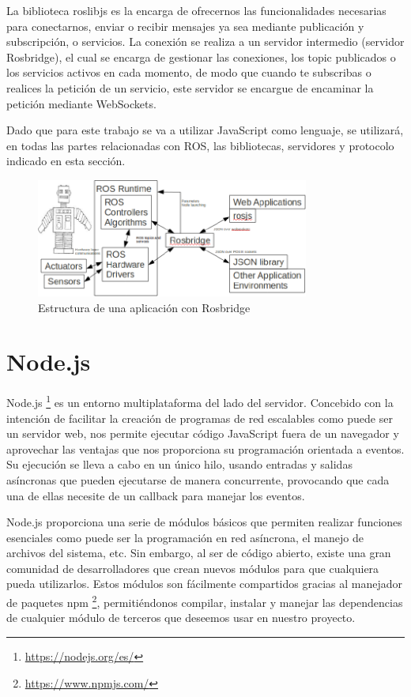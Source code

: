 La biblioteca roslibjs es la encarga de ofrecernos las funcionalidades necesarias para conectarnos, enviar o recibir mensajes ya sea mediante publicación y subscripción, o servicios. La conexión se realiza a un servidor intermedio (servidor Rosbridge), el cual se encarga de gestionar las conexiones, los topic publicados o los servicios activos en cada momento, de modo que cuando te subscribas o realices la petición de un servicio, este servidor se encargue de encaminar la petición mediante WebSockets.

Dado que para este trabajo se va a utilizar JavaScript como lenguaje, se utilizará, en todas las partes relacionadas con ROS, las bibliotecas, servidores y protocolo indicado en esta sección.

\begin{figure}[H]
  \begin{center}
    \includegraphics[width=0.8\textwidth]{figures/estructurarosbridge.png}
		\caption{Estructura de una aplicación con Rosbridge}
		\label{fig.estructurarosbridge}
		\end{center}
\end{figure}

\section{Node.js}
Node.js \footnote{\url{https://nodejs.org/es/}} es un entorno multiplataforma del lado del servidor. Concebido con la intención de facilitar la creación de programas de red escalables como puede ser un servidor web, nos permite ejecutar código JavaScript fuera de un navegador y aprovechar las ventajas que nos proporciona su programación orientada a eventos. Su ejecución se lleva a cabo en un único hilo, usando entradas y salidas asíncronas que pueden ejecutarse de manera concurrente, provocando que cada una de ellas necesite de un callback para manejar los eventos. 

Node.js proporciona una serie de módulos básicos que permiten realizar funciones esenciales como puede ser la programación en red asíncrona, el manejo de archivos del sistema, etc. Sin embargo, al ser de código abierto, existe una gran comunidad de desarrolladores que crean nuevos módulos para que cualquiera pueda utilizarlos. Estos módulos son fácilmente compartidos gracias al manejador de paquetes npm \footnote{\url{https://www.npmjs.com/}}, permitiéndonos compilar, instalar y manejar las dependencias de cualquier módulo de terceros que deseemos usar en nuestro proyecto.
 
